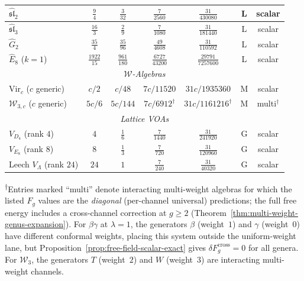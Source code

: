 \begin{table}[ht]
{{\begin{tabular}{|l|c|c|c|c|c|c|}
$\widehat{\mathfrak{sl}}_2$
 & $\tfrac{9}{4}$ & $\tfrac{3}{32}$
 & $\tfrac{7}{2560}$ & $\tfrac{31}{430080}$
 & L & scalar \\
\hline
$\widehat{\mathfrak{sl}}_3$
 & $\tfrac{16}{3}$ & $\tfrac{2}{9}$
 & $\tfrac{7}{1080}$ & $\tfrac{31}{181440}$
 & L & scalar \\
\hline
$\widehat{G}_2$
 & $\tfrac{35}{4}$ & $\tfrac{35}{96}$
 & $\tfrac{49}{4608}$ & $\tfrac{31}{110592}$
 & L & scalar \\
\hline
$\widehat{E}_8$ ($k{=}1$)
 & $\tfrac{1922}{15}$ & $\tfrac{961}{180}$
 & $\tfrac{6727}{43200}$ & $\tfrac{29791}{7257600}$
 & L & scalar \\
\hline
\multicolumn{7}{|c|}{\textit{$\mathcal{W}$-Algebras}} \\
\hline
$\mathrm{Vir}_{c}$ ($c$ generic)
 & $c/2$ & $c/48$
 & $7c/11520$ & $31c/1935360$
 & M & scalar \\
\hline
$\mathcal{W}_{3,c}$ ($c$ generic)
 & $5c/6$ & $5c/144$
 & $7c/6912^\dagger$ & $31c/1161216^\dagger$
 & M & multi$^\dagger$ \\
\hline
\multicolumn{7}{|c|}{\textit{Lattice VOAs}} \\
\hline
$V_{D_4}$ (rank $4$)
 & $4$ & $\tfrac{1}{6}$
 & $\tfrac{7}{1440}$ & $\tfrac{31}{241920}$
 & G & scalar \\
\hline
$V_{E_8}$ (rank $8$)
 & $8$ & $\tfrac{1}{3}$
 & $\tfrac{7}{720}$ & $\tfrac{31}{120960}$
 & G & scalar \\
\hline
Leech $V_\Lambda$ (rank $24$)
 & $24$ & $1$
 & $\tfrac{7}{240}$ & $\tfrac{31}{40320}$
 & G & scalar \\
\hline
\end{tabular}
}%
}%
\end{table}

\noindent
\textsuperscript{$\dagger$}Entries marked ``multi'' denote
interacting multi-weight algebras for which the listed $F_g$ values are the
\emph{diagonal} (per-channel universal) predictions; the full
free energy includes a cross-channel correction at $g \geq 2$
(Theorem~\ref{thm:multi-weight-genus-expansion}).
For $\beta\gamma$ at $\lambda = 1$, the generators $\beta$
(weight~$1$) and $\gamma$ (weight~$0$) have different conformal
weights, placing this system outside the uniform-weight lane, but
Proposition~\ref{prop:free-field-scalar-exact} gives
$\delta F_g^{\mathrm{cross}}=0$ for all genera. For
$\mathcal{W}_3$, the generators $T$ (weight~$2$) and $W$
(weight~$3$) are interacting multi-weight channels.

